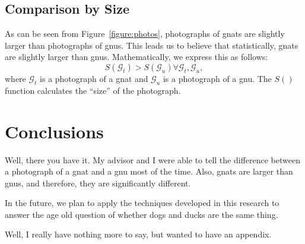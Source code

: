 \documentclass[12pt]{thesis}
\begin{document}
\section{Comparison by Size}
 As can be seen from
Figure~\ref{figure:photos}, photographs of gnats are slightly larger
than photographs of gnus.  This leads us to believe that
statistically, gnats are slightly larger than gnus.  Mathematically,
we express this as follows:
\begin{equation}
S(\mathcal{G}_t) > S(\mathcal{G}_u) \forall
\mathcal{G}_t,\mathcal{G}_u,
\end{equation}
where $\mathcal{G}_t$ is a photograph of a gnat and $\mathcal{G}_u$ is
a photograph of a gnu.  The $S()$ function calculates the ``size'' of
the photograph.

\chapter{Conclusions}

Well, there you have it.  My advisor and I were able to tell the
difference between a photograph of a gnat and a gnu most of the time.
Also, gnats are larger than gnus, and therefore, they are
significantly different.

In the future, we plan to apply the techniques developed in this
research to answer the age old question of whether dogs and ducks are
the same thing.

\supplementaries





\begin{appendices}

 Well, I really have nothing more to say,
but wanted to have an appendix.

\end{appendices}



\end{document}
